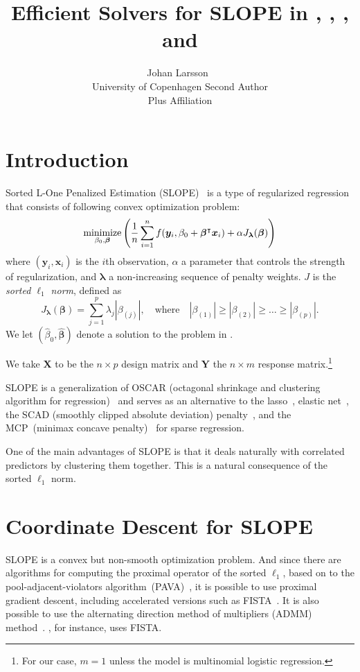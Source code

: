 \documentclass[article]{jss}
\author{Johan Larsson~\orcidlink{0000-0002-4029-5945}\\University of Copenhagen
   \And Second Author\\Plus Affiliation}
\title{Efficient Solvers for SLOPE in \proglang{R}, \proglang{Python}, \proglang{Julia}, and \proglang{C++}}
\let\Cref\crtCref
\begin{document}
\section{Introduction}

Sorted L-One Penalized Estimation
(SLOPE)~\citep{bogdan2013,zeng2014,bogdan2015} is a type of
regularized regression that consists of following convex optimization problem:
\begin{equation}
  \label{eq:slope}
  \operatorname*{minimize}_{\beta_0,\bm{\beta}} \left( \frac{1}{n} \sum_{i=1}^n f(\bm{y}_i, \beta_0 + \bm{\beta}^\intercal \bm{x}_i) + \alpha J_{\bm{\lambda}}(\bm{\beta})\right)
\end{equation}
where \((\bm{y}_i, \bm{x}_i)\) is the \(i\)th observation, \(\alpha\) a parameter
that controls the strength of regularization, and \(\bm{\lambda}\) a non-increasing sequence of penalty weights. \(J\) is the
\emph{sorted $\ell_1$ norm}, defined as
\begin{equation}
  \label{eq:sl1}
  J_{\bm{\lambda}}(\bm{\beta}) = \sum_{j=1}^p \lambda_j |\beta_{(j)}|, \quad
  \text{where}\quad |\beta_{(1)}| \geq |\beta_{(2)}| \geq \ldots \geq
  |\beta_{(p)}|.
\end{equation}
We let \((\hat{\beta}_0, \hat{\bm{\beta}})\) denote a solution to the problem in \Cref{eq:slope}.

We take \(\bm{X}\) to be the \(n \times p\) design matrix and \(\bm{Y}\) the
\(n \times m\) response matrix.\footnote{For our case, \(m = 1\) unless
  the model is multinomial logistic regression.}

SLOPE is a generalization of OSCAR (octagonal shrinkage and clustering
algorithm for regression)~\citep{bondell2008} and serves as an alternative to the
lasso~\citep{santosa1986,donoho1994,donoho1995,tibshirani1996}, elastic
net~\citep{zou2005}, the SCAD (smoothly clipped absolute deviation)
penalty~\citep{fan2001}, and the MCP~(minimax concave
penalty)~\citep{zhang2010} for sparse regression.

One of the main advantages of SLOPE is that it deals naturally with
correlated predictors by clustering them together. This is a natural
consequence of the sorted \(\ell_1\) norm.

\section{Coordinate Descent for SLOPE}

SLOPE is a convex but non-smooth optimization problem. And since there are
algorithms for computing the proximal operator of the sorted \(\ell_1\), based
on to the pool-adjacent-violators algorithm~(PAVA)~\citep{barlow1972}, it is
possible to use proximal gradient descent, including accelerated versions such
as FISTA~\citep{beck2009}. It is also possible to use the alternating direction
method of multipliers (ADMM) method~\citep{boyd2010}. \citet{bogdan2015}, for
instance, uses FISTA.
\end{document}
